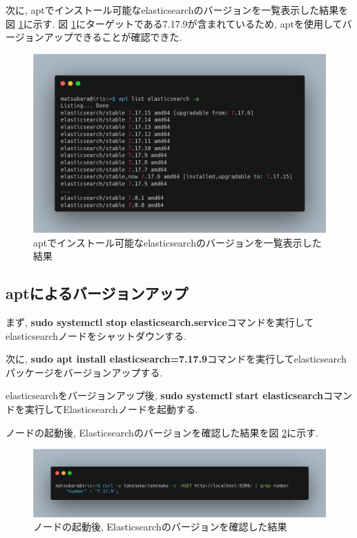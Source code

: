 \documentclass[a4j,12pt,]{jarticle}
\begin{document}
次に, aptでインストール可能なelasticsearchのバージョンを一覧表示した結果を図 \ref{p2}に示す. 図 \ref{p2}にターゲットである7.17.9が含まれているため, aptを使用してバージョンアップできることが確認できた.

\begin{figure}[H]
  \begin{center}
    \includegraphics[width=160mm]{apt-list.png}
    \caption{aptでインストール可能なelasticsearchのバージョンを一覧表示した結果}
    \label{p2}
  \end{center}
\end{figure}

\subsection{aptによるバージョンアップ}

まず, \textbf{sudo systemctl stop elasticsearch.service}コマンドを実行してelasticsearchノードをシャットダウンする.

次に, \textbf{sudo apt install elasticsearch=7.17.9}コマンドを実行してelasticsearchパッケージをバージョンアップする.

elasticsearchをバージョンアップ後, \textbf{sudo systemctl start elasticsearch}コマンドを実行してElasticsearchノードを起動する.

ノードの起動後, Elasticsearchのバージョンを確認した結果を図 \ref{p3}に示す.

\begin{figure}[H]
  \begin{center}
    \includegraphics[width=160mm]{version-check.png}
    \caption{ノードの起動後, Elasticsearchのバージョンを確認した結果}
    \label{p3}
  \end{center}
\end{figure}
\end{document}
